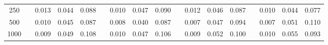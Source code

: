 % 
\begin{tabular}{ccccccccccccccccc}
  \hline
  \hline
250 &  & 0.013 & 0.044 & 0.088 &  & 0.010 & 0.047 & 0.090 &  & 0.012 & 0.046 & 0.087 &  & 0.010 & 0.044 & 0.077 \\ 
  500 &  & 0.010 & 0.045 & 0.087 &  & 0.008 & 0.040 & 0.087 &  & 0.007 & 0.047 & 0.094 &  & 0.007 & 0.051 & 0.110 \\ 
  1000 &  & 0.009 & 0.049 & 0.108 &  & 0.010 & 0.047 & 0.106 &  & 0.009 & 0.052 & 0.100 &  & 0.010 & 0.055 & 0.093 \\ 
   \hline
\end{tabular}
